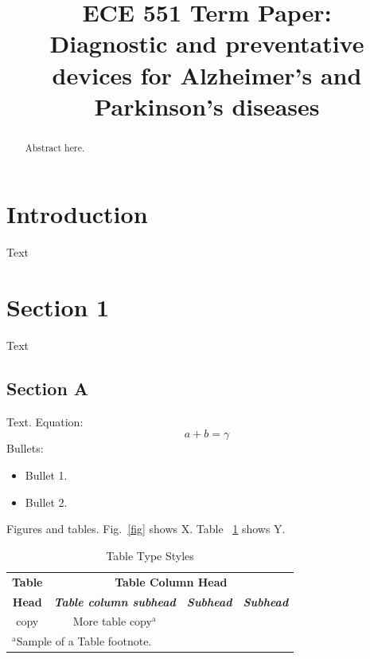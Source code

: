 \documentclass[conference]{IEEEtran}
\begin{document}
	
	\title{ECE 551 Term Paper:\\Diagnostic and preventative devices for Alzheimer’s and Parkinson’s diseases
	}
	
	\author{
	}
	
	\maketitle
	
	\begin{abstract}
		Abstract here.
	\end{abstract}
	
	\section{Introduction}
	Text
	
	\section{Section 1}
	Text
	\subsection{Section A}
	Text. Equation:
	\begin{equation}
		a+b=\gamma\label{eq}
	\end{equation}
	Bullets:
	\begin{itemize}
		\item Bullet 1.
		\item Bullet 2.
	\end{itemize}
	Figures and tables. Fig.~\ref{fig} shows X. Table ~\ref{tab1} shows Y.
	
	\begin{table}[htbp]
		\caption{Table Type Styles}
		\begin{center}
			\begin{tabular}{|c|c|c|c|}
				\hline
				\textbf{Table}&\multicolumn{3}{|c|}{\textbf{Table Column Head}} \\
				\cline{2-4} 
				\textbf{Head} & \textbf{\textit{Table column subhead}}& \textbf{\textit{Subhead}}& \textbf{\textit{Subhead}} \\
				\hline
				copy& More table copy$^{\mathrm{a}}$& &  \\
				\hline
				\multicolumn{4}{l}{$^{\mathrm{a}}$Sample of a Table footnote.}
			\end{tabular}
			\label{tab1}
		\end{center}
	\end{table}
	
\end{document}
